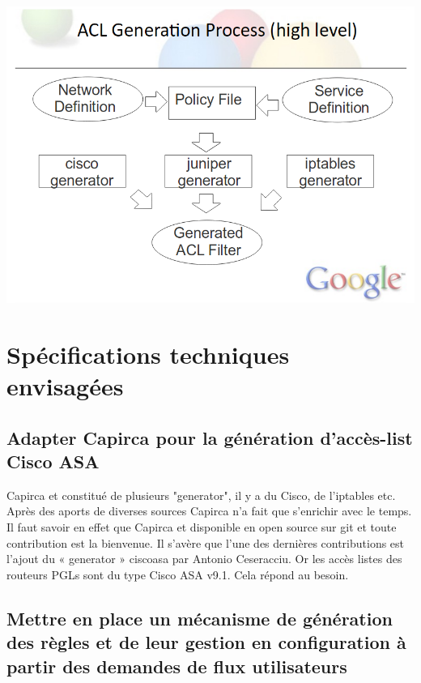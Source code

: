 \documentclass{article}
\begin{document}
\includegraphics[scale=0.4]{capirca.png}

\maketitle
\section{Spécifications techniques envisagées}

\maketitle
\subsection{Adapter Capirca pour la génération d’accès-list Cisco ASA}

Capirca et constitué de plusieurs "generator", il y a du Cisco, de l’iptables etc. Après des aports de diverses sources Capirca n’a fait que s’enrichir avec le temps. Il faut savoir en effet que Capirca et disponible en open source sur git et toute contribution est la bienvenue. Il s’avère que l’une des dernières contributions est l’ajout du « generator » ciscoasa par Antonio Ceseracciu. Or les accès listes des routeurs PGLs sont du type Cisco ASA v9.1. Cela répond au besoin.

\maketitle
\subsection{Mettre en place un mécanisme de génération des règles et de leur gestion en configuration à partir des demandes de flux utilisateurs}
\end{document}
